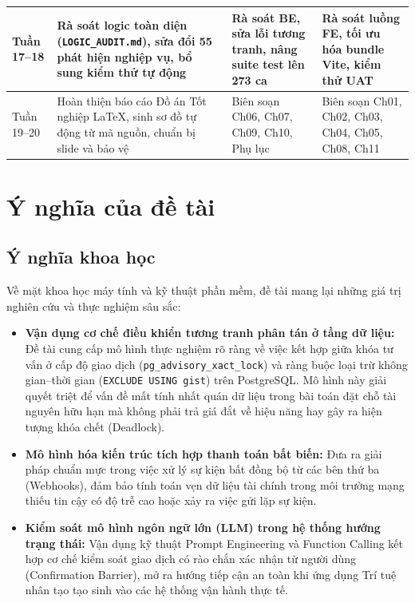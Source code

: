 \begin{table}[H]
\begin{tabular}{|p{1.6cm}|p{7.2cm}|p{2.6cm}|p{2.6cm}|}
\hline
Tuần 17--18 & Rà soát logic toàn diện (\texttt{LOGIC\_AUDIT.md}), sửa đổi 55 phát hiện nghiệp vụ, bổ sung kiểm thử tự động & Rà soát BE, sửa lỗi tương tranh, nâng suite test lên 273 ca & Rà soát luồng FE, tối ưu hóa bundle Vite, kiểm thử UAT \\
\hline
Tuần 19--20 & Hoàn thiện báo cáo Đồ án Tốt nghiệp LaTeX, sinh sơ đồ tự động từ mã nguồn, chuẩn bị slide và bảo vệ & Biên soạn Ch06, Ch07, Ch09, Ch10, Phụ lục & Biên soạn Ch01, Ch02, Ch03, Ch04, Ch05, Ch08, Ch11 \\
\hline
\end{tabular}
\end{table}

\section{Ý nghĩa của đề tài}
\label{sec:ynghia}

\subsection{Ý nghĩa khoa học}
Về mặt khoa học máy tính và kỹ thuật phần mềm, đề tài mang lại những giá trị nghiên cứu và thực nghiệm sâu sắc:
\begin{itemize}
    \item \textbf{Vận dụng cơ chế điều khiển tương tranh phân tán ở tầng dữ liệu:} Đề tài cung cấp mô hình thực nghiệm rõ ràng về việc kết hợp giữa khóa tư vấn ở cấp độ giao dịch (\texttt{pg\_advisory\_xact\_lock}) và ràng buộc loại trừ không gian--thời gian (\texttt{EXCLUDE USING gist}) trên PostgreSQL. Mô hình này giải quyết triệt để vấn đề mất tính nhất quán dữ liệu trong bài toán đặt chỗ tài nguyên hữu hạn mà không phải trả giá đắt về hiệu năng hay gây ra hiện tượng khóa chết (Deadlock).
    \item \textbf{Mô hình hóa kiến trúc tích hợp thanh toán bất biến:} Đưa ra giải pháp chuẩn mực trong việc xử lý sự kiện bất đồng bộ từ các bên thứ ba (Webhooks), đảm bảo tính toán vẹn dữ liệu tài chính trong môi trường mạng thiếu tin cậy có độ trễ cao hoặc xảy ra việc gửi lặp sự kiện.
    \item \textbf{Kiểm soát mô hình ngôn ngữ lớn (LLM) trong hệ thống hướng trạng thái:} Vận dụng kỹ thuật Prompt Engineering và Function Calling kết hợp cơ chế kiểm soát giao dịch có rào chắn xác nhận từ người dùng (Confirmation Barrier), mở ra hướng tiếp cận an toàn khi ứng dụng Trí tuệ nhân tạo tạo sinh vào các hệ thống vận hành thực tế.
\end{itemize}

